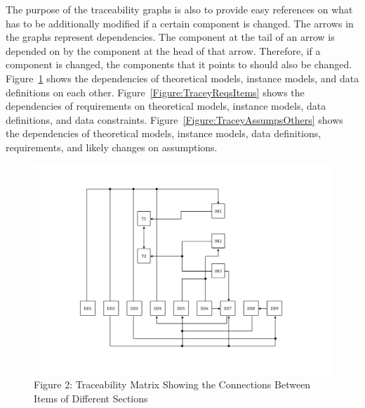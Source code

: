 \documentclass[12pt]{article}
\begin{document}
The purpose of the traceability graphs is also to provide easy references on what has to be additionally modified if a certain component is changed. The arrows in the graphs represent dependencies. The component at the tail of an arrow is depended on by the component at the head of that arrow. Therefore, if a component is changed, the components that it points to should also be changed. Figure~\ref{Figure:TraceyItemSecs} shows the dependencies of theoretical models, instance models, and data definitions on each other. Figure~\ref{Figure:TraceyReqsItems} shows the dependencies of requirements on theoretical models, instance models, data definitions, and data constraints. Figure~\ref{Figure:TraceyAssumpsOthers} shows the dependencies of theoretical models, instance models, data definitions, requirements, and likely changes on assumptions.
\begin{figure}
\begin{center}
\includegraphics[width=\textwidth]{../../../datafiles/GlassBR/Trace.png}
\caption{Figure 2: Traceability Matrix Showing the Connections Between Items of Different Sections}
\label{Figure:TraceyItemSecs}
\end{center}
\end{figure}
\end{document}
